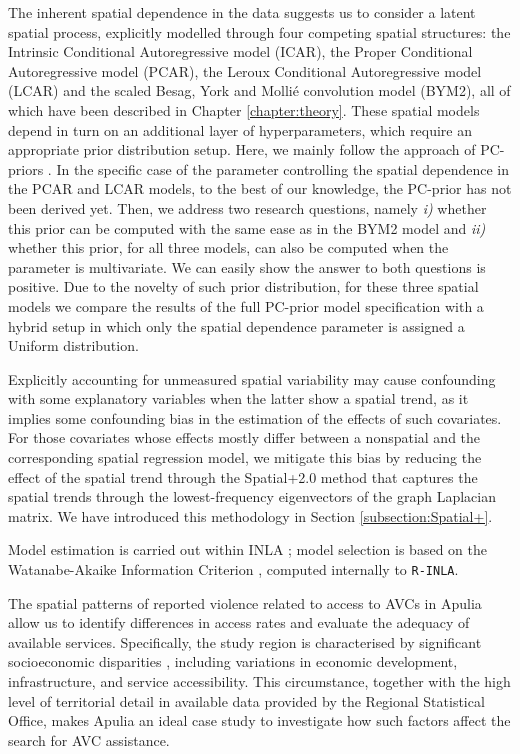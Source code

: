 \documentclass[openany, 11pt, oneside]{book}
\begin{document}
The inherent spatial dependence in the data suggests us to consider a latent spatial process, explicitly modelled through four competing spatial structures: the Intrinsic Conditional Autoregressive model (ICAR), the Proper Conditional Autoregressive model (PCAR), the Leroux Conditional Autoregressive model (LCAR) and the scaled Besag, York and Molli\'{e} convolution model (BYM2), all of which have been described in Chapter \ref{chapter:theory}.
%
These spatial models depend in turn on an additional layer of hyperparameters, which require an appropriate prior distribution setup. Here, we mainly follow the approach of PC-priors \textcite[][see also section \ref{section:PC_INLA}]{PC}. In the specific case of the parameter controlling the spatial dependence in the PCAR and LCAR models, to the best of our knowledge, the PC-prior has not been derived yet. Then, we address two research questions, namely \textit{i)} whether this prior can be computed with the same ease as in the BYM2 model \textcite{BYM2, PC} and \textit{ii)} whether this prior, for all three models, can also be computed when the parameter is multivariate. We can easily show the answer to both questions is positive. Due to the novelty of such prior distribution, for these three spatial models we compare the results of the full PC-prior model specification with a hybrid setup in which only the spatial dependence parameter is assigned a Uniform distribution.

Explicitly accounting for unmeasured spatial variability may cause confounding with some explanatory variables when the latter show a spatial trend, as it implies some confounding bias in the estimation of the effects of such covariates. For those covariates whose effects mostly differ between a nonspatial and the corresponding spatial regression model, we mitigate this bias by reducing the effect of the spatial trend through the Spatial+2.0 method \parencite{Urdangarin24} that captures the spatial trends through the lowest-frequency eigenvectors of the graph Laplacian matrix. We have introduced this methodology in Section \ref{subsection:Spatial+}.

Model estimation is carried out within INLA \parencite[][see also section \ref{section:INLA}]{INLA, VBINLA2023}; model selection is based on the Watanabe-Akaike Information Criterion \parencite[WAIC][see also Section \ref{subsection:criteria}]{GelmanWAIC}, computed internally to \texttt{R-INLA}.

The spatial patterns of reported violence related to access to AVCs in Apulia allow us to identify differences in access rates and evaluate the adequacy of available services. Specifically, the study region is characterised by significant socioeconomic disparities \parencite{PROMETHEEII}, including variations in economic development, infrastructure, and service accessibility. This circumstance, together with the high level of territorial detail in available data provided by the Regional Statistical Office, makes Apulia an ideal case study to investigate how such factors affect the search for AVC assistance. 
\end{document}
